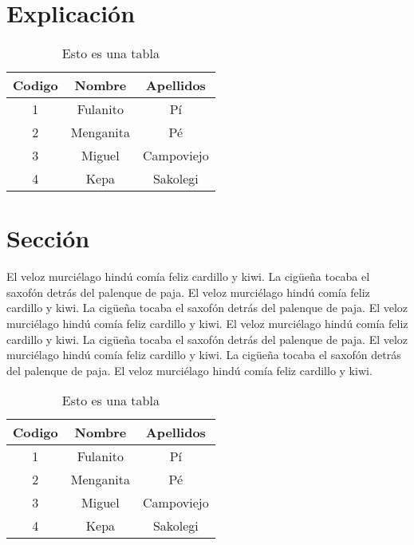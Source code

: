 
\section{Explicación} 



\begin{table}
\begin{center}
\begin{tabular}{|c|c|c|}
\hline Codigo & Nombre & Apellidos \\ 
\hline\hline 1 & Fulanito & Pí \\ 
\hline 2 & Menganita & Pé \\ 
\hline 3 & Miguel & Campoviejo \\ 
\hline 4 & Kepa & Sakolegi \\ 
\hline 
\end{tabular} 
\caption{Esto es una tabla}
\label{tbTabla1}
\end{center}
\end{table}




\section{Sección} 

El veloz murciélago hindú comía feliz cardillo y kiwi.  La cigüeña tocaba el saxofón detrás del palenque de paja.  El veloz murciélago hindú comía feliz cardillo y kiwi.  La cigüeña tocaba el saxofón detrás del palenque de paja.  El veloz murciélago hindú comía feliz cardillo y kiwi. El veloz murciélago hindú comía feliz cardillo y kiwi.  La cigüeña tocaba el saxofón detrás del palenque de paja.  El veloz murciélago hindú comía feliz cardillo y kiwi.  La cigüeña tocaba el saxofón detrás del palenque de paja.  El veloz murciélago hindú comía feliz cardillo y kiwi.


\begin{table}
\begin{center}
\begin{tabular}{|c|c|c|}
\hline Codigo & Nombre & Apellidos \\ 
\hline\hline 1 & Fulanito & Pí \\ 
\hline 2 & Menganita & Pé \\ 
\hline 3 & Miguel & Campoviejo \\ 
\hline 4 & Kepa & Sakolegi \\ 
\hline 
\end{tabular} 
\caption{Esto es una tabla}
\label{tbTabla2}
\end{center}
\end{table}

